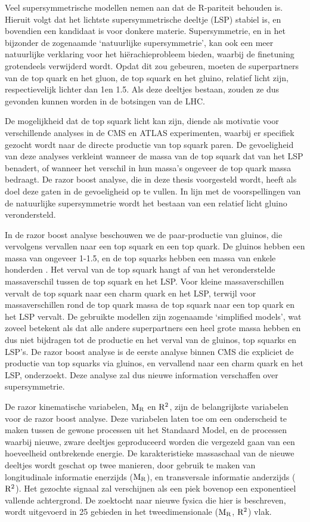 Veel supersymmetrische modellen nemen aan dat de R-pariteit behouden is. Hieruit volgt dat het
lichtste supersymmetrische deeltje (LSP) stabiel is, en bovendien een kandidaat is voor donkere
materie. Supersymmetrie, en in het bijzonder de zogenaamde `natuurlijke supersymmetrie', kan ook
een meer natuurlijke verklaring voor het hi\"erachie\-probleem bieden, waarbij de finetuning
grotendeels verwijderd wordt. Opdat dit zou gebeuren, moeten de superpartners van de top quark en
het gluon, de top squark en het gluino, relatief licht zijn, respectievelijk lichter dan 1\TeV en
1.5\TeV. Als deze deeltjes bestaan, zouden ze dus gevonden kunnen worden in de botsingen van de
LHC. 

De mogelijkheid dat de top squark licht kan zijn, diende als motivatie voor verschillende analyses
in de CMS en ATLAS experimenten, waarbij er specifiek gezocht wordt naar de directe productie van
top squark paren. De gevoeligheid van deze analyses verkleint wanneer de massa van de top squark
dat van het LSP benadert, of wanneer het verschil in hun massa's ongeveer de top quark massa
bedraagt. De razor boost analyse, die in deze thesis voorgesteld wordt, heeft als doel deze gaten in
de gevoeligheid op te vullen. In lijn met de voorspellingen van de natuurlijke supersymmetrie wordt
het bestaan van een relatief licht gluino verondersteld. 

In de razor boost analyse beschouwen we de paar-productie van gluinos, die vervolgens vervallen
naar een top squark en een top quark. De gluinos hebben een massa van ongeveer 1-1.5\TeV, en de top
squarks hebben een massa van enkele honderden \GeV. Het verval van de top squark hangt af van het
veronderstelde massaverschil tussen de top squark en het LSP. Voor kleine massaverschillen vervalt
de top squark naar een charm quark en het LSP, terwijl voor massaverschillen rond de top quark
massa de top squark naar een top quark en het LSP vervalt. De gebruikte modellen zijn zogenaamde
`simplified models', wat zoveel betekent als dat alle andere superpartners een heel grote massa
hebben en dus niet bijdragen tot de productie en het verval van de gluinos, top squarks en LSP's.
De razor boost analyse is de eerste analyse binnen CMS die
expliciet de productie van top squarks via gluinos, en vervallend naar een charm quark en het LSP,
onderzoekt. Deze analyse zal dus nieuwe information verschaffen over supersymmetrie. 

De razor kinematische variabelen, $\mathrm{M_R}$ en $\mathrm{R^2}$, zijn de belangrijkste variabelen voor de
razor boost analyse. Deze variabelen laten toe om een onderscheid te maken tussen de gewone
processen uit het Standaard Model, en de processen waarbij nieuwe, zware deeltjes geproduceerd
worden die vergezeld gaan van een hoeveelheid ontbrekende energie. De karakteristieke massaschaal
van de nieuwe deeltjes wordt geschat op twee manieren, door gebruik te maken van longitudinale
informatie enerzijds ($\mathrm{M_R}$), en transversale informatie anderzijds ($\mathrm{R^2}$). Het gezochte signaal
zal verschijnen als een piek bovenop een exponentieel vallende achtergrond. De zoektocht naar
nieuwe fysica die hier is beschreven, wordt uitgevoerd in 25 gebieden in het tweedimensionale
($\mathrm{M_R}$, $\mathrm{R^2}$) vlak. 

